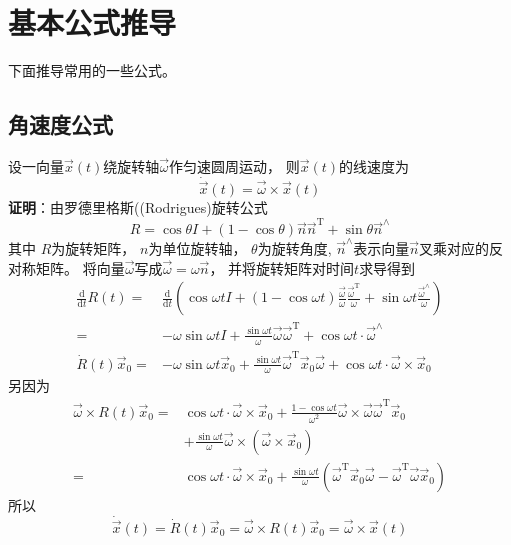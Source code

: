\section{基本公式推导}
下面推导常用的一些公式。

\subsection{角速度公式}
设一向量$\vec{x}(t)$绕旋转轴$\vec{\omega}$作匀速圆周运动，
则$\vec{x}(t)$的线速度为
\[\dot{\vec{x}}(t)=\vec{\omega}\times\vec{x}(t)\]
\textbf{证明}：由罗德里格斯((Rodrigues)旋转公式
\[R=\cos\theta I+(1-\cos\theta)\vec{n}\vec{n}^\text{T}+\sin\theta\vec{n}^{\wedge}\]
其中
$R$为旋转矩阵，
$n$为单位旋转轴，
$\theta$为旋转角度,
$\vec{n}^{\wedge}$表示向量$\vec{n}$叉乘对应的反对称矩阵。
将向量$\vec{\omega}$写成$\vec{\omega}=\omega\vec{n}$，
并将旋转矩阵对时间$t$求导得到
\begin{align*}
    \frac{\text{d}}{\text{d}t}R(t)
    =& \frac{\text{d}}{\text{d}t}\left(
        \cos\omega t I
        +(1-\cos\omega t)\frac{\vec{\omega}}{\omega}\frac{\vec{\omega}^\text{T}}{\omega}
        +\sin\omega t\frac{\vec{\omega}^{\wedge}}{\omega}
    \right) \\
    =& -\omega\sin\omega tI
        +\frac{\sin\omega t}{\omega}\vec{\omega}\vec{\omega}^\text{T}
        +\cos\omega t\cdot\vec{\omega}^{\wedge} \\
    \dot{R}(t)\vec{x}_0
    =& -\omega\sin\omega t\vec{x}_0
        +\frac{\sin\omega t}{\omega}\vec{\omega}^\text{T}\vec{x}_0\vec{\omega}
        +\cos\omega t\cdot\vec{\omega}\times\vec{x}_0
\end{align*}
另因为
\begin{align*}
    \vec{\omega}\times R(t)\vec{x}_0
    =& \cos\omega t\cdot\vec{\omega}\times\vec{x}_0
        +\frac{1-\cos\omega t}{\omega^2}\vec{\omega}\times\vec{\omega}\vec{\omega}^\text{T}\vec{x}_0 \\
        &+ \frac{\sin\omega t}{\omega}\vec{\omega}\times(\vec{\omega}\times\vec{x}_0) \\
    =& \cos\omega t\cdot\vec{\omega}\times\vec{x}_0
        +\frac{\sin\omega t}{\omega}(\vec{\omega}^\text{T}\vec{x}_0\vec{\omega}
        -\vec{\omega}^\text{T}\vec{\omega}\vec{x}_0)
\end{align*}
所以
\[\dot{\vec{x}}(t)=\dot{R}(t)\vec{x}_0=\vec{\omega}\times R(t)\vec{x}_0=\vec{\omega}\times\vec{x}(t)\]


